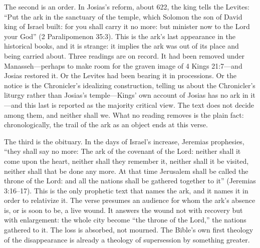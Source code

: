 The second is an order. In Josias's reform, about 622, the king tells the
Levites: ``Put the ark in the sanctuary of the temple, which Solomon the son
of David king of Israel built: for you shall carry it no more: but minister
now to the Lord your God'' (2 Paralipomenon 35:3). This is the ark's last appearance in the historical
books, and it is strange: it implies the ark was out of its place and
being carried about. Three readings are on record. It had been
removed under Manasseh---perhaps to make room for the graven image of
4 Kings 21:7---and Josias restored it. Or the Levites had been bearing it in
processions. Or the notice is the Chronicler's idealizing construction,
telling us about the Chronicler's liturgy rather than Josias's
temple---Kings' own account of Josias has no ark in it---and this last is
reported as the majority critical view. The text does not decide among
them, and neither shall we. What no reading removes is the plain fact:
chronologically, the trail of the ark as an object ends at this verse.

The third is the obituary. In the days of Israel's increase, Jeremias
prophesies, ``they shall say no more: The ark of the covenant of the Lord:
neither shall it come upon the heart, neither shall they remember it,
neither shall it be visited, neither shall that be done any more. At that
time Jerusalem shall be called the throne of the Lord: and all the nations
shall be gathered together to it'' (Jeremias 3:16--17). This is the
only prophetic text that names the ark, and it names it in order to
relativize it. The verse presumes an audience for whom the ark's absence
is, or is soon to be, a live wound. It answers the wound not with
recovery but with enlargement: the whole city become ``the throne of the
Lord,'' the nations gathered to it. The loss is
absorbed, not mourned. The Bible's own first theology of the disappearance
is already a theology of supersession by something greater.

